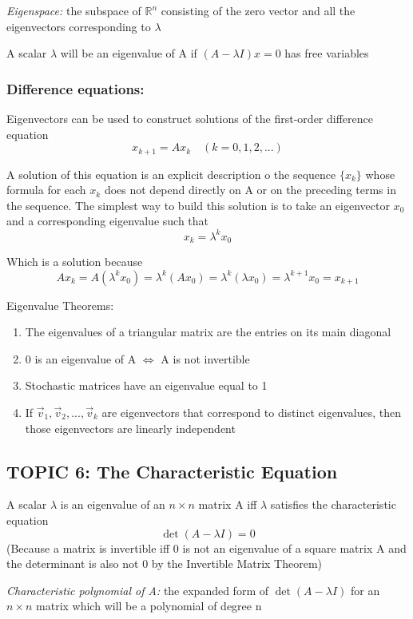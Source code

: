 \documentclass[12pt]{article} %
\newcommand{\R}{\mathbb{R}}
\begin{document}
\emph{Eigenspace:} the subspace of $\R^n$ consisting of the zero vector and all the eigenvectors corresponding to $\lambda$

A scalar $\lambda$ will be an eigenvalue of A if $(A - \lambda I)x = 0$ has free variables

\subsubsection{Difference equations:}
Eigenvectors can be used to construct solutions of the first-order difference equation
$$x_{k+1} = Ax_k \quad (k = 0, 1, 2, ...)$$

A solution of this equation is an explicit description o the sequence $\{x_k\}$ whose formula for each $x_k$ does not depend directly on A or on the preceding terms in the sequence. The simplest way to build this solution is to take an eigenvector $x_0$ and a corresponding eigenvalue such that 
$$x_k = \lambda^k x_0$$

Which is a solution because 
$$Ax_k = A(\lambda^k x_0)= \lambda^k (Ax_0) = \lambda^k (\lambda x_0) = \lambda^{k + 1}x_0 = x_{k+1}$$

Eigenvalue Theorems:
\begin{enumerate}
	\item The eigenvalues of a triangular matrix are the entries on its main diagonal
	\item 0 is an eigenvalue of A $\iff$ A is not invertible
	\item Stochastic matrices have an eigenvalue equal to 1
	\item If $\vec{v}_1, \vec{v}_2, ..., \vec{v}_k$ are eigenvectors that correspond to distinct eigenvalues, then those eigenvectors are linearly independent
\end{enumerate}
\subsection{TOPIC 6: The Characteristic Equation}
A scalar $\lambda$ is an eigenvalue of an $n \times n$ matrix A iff $\lambda$ satisfies the characteristic equation 
$$\det (A - \lambda I) = 0$$
(Because a matrix is invertible iff 0 is not an eigenvalue of a square matrix A and the determinant is also not 0 by the Invertible Matrix Theorem)

\emph{Characteristic polynomial of A:} the expanded form of $\det(A-\lambda I)$ for an $n \times n$ matrix which will be a polynomial of degree n
\end{document}

